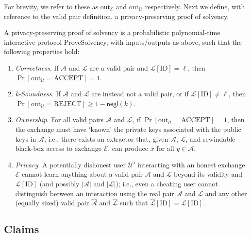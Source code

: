 For brevity, we refer to these as $\text{out}_{\mathcal{E}}$ and $\text{out}_{\mathcal{U}}$ respectively. Next we define, with reference to the valid pair definition, a privacy-preserving proof of solvency.


\begin{definition}
\label{def:2}

A privacy-preserving proof of solvency is a probabilistic polynomial-time interactive protocol ProveSolvency, with inputs/outputs as above, such that the following properties hold:

\begin{enumerate}
\item \textit{Correctness}. If $\mathcal{A}$ and $\mathcal{L}$ are a valid pair and $\mathcal{L}[\text{ID}] = \ell$, then $\Pr[\text{out}_{\mathcal{U}} = \text{ACCEPT}] = 1$.
\item \textit{k-Soundness}. If $\mathcal{A}$ and $\mathcal{L}$ are instead not a valid pair, or if $\mathcal{L}[\text{ID}] \neq \ell$, then $\Pr[\text{out}_{\mathcal{U}} = \text{REJECT}] \geq 1 - \mathsf{negl}(k)$.
\item \textit{Ownership}. For all valid pairs $\mathcal{A}$ and $\mathcal{L}$, if $\Pr[\text{out}_{\mathcal{U}} = \text{ACCEPT}] = 1$, then the exchange must have ‘known’ the private keys associated with the public keys in $\mathcal{A}$; i.e., there exists an extractor that, given $\mathcal{A}$, $\mathcal{L}$, and rewindable black-box access to exchange $\mathcal{E}$, can produce $x$ for all $y \in \mathcal{A}$.
\item \textit{Privacy}. A potentially dishonest user $\mathcal{U}'$ interacting with an honest exchange $\mathcal{E}$ cannot learn anything about a valid pair $\mathcal{A}$ and $\mathcal{L}$ beyond its validity and $\mathcal{L}[\text{ID}]$ (and possibly $|\mathcal{A}|$ and $|\mathcal{L}|$); i.e., even a cheating user cannot distinguish between an interaction using the real pair $\mathcal{A}$ and $\mathcal{L}$ and any other (equally sized) valid pair $\hat{\mathcal{A}}$ and $\hat{\mathcal{L}}$ such that $\hat{\mathcal{L}}[\text{ID}] = \mathcal{L}[\text{ID}]$.
\end{enumerate}
\end{definition}




\subsection{Claims}

